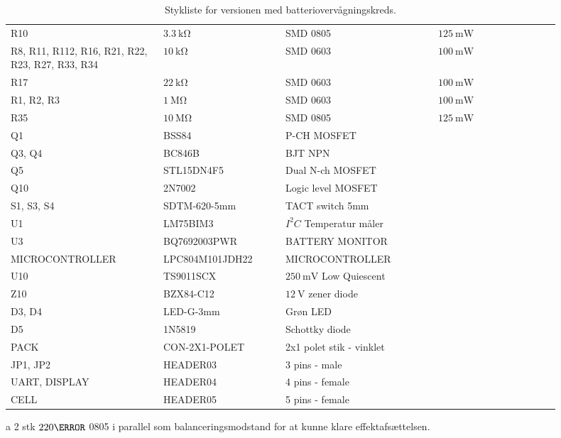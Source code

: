 \begin{table}[h!]
\begin{threeparttable}
\begin{tabular}{p{0.25\linewidth}p{0.2\linewidth}p{0.25\linewidth}p{0.15\linewidth}p{0.05\linewidth}}
			R10 & $\SI{3.3}{\kilo\ohm}$ & SMD 0805 & $\SI{125}{\milli\watt}$  \\
			R8, R11, R112, R16, R21, R22, R23, R27, R33, R34 & $\SI{10}{\kilo\ohm}$ & SMD 0603 & $\SI{100}{\milli\watt}$  \\
			R17 & $\SI{22}{\kilo\ohm}$ & SMD 0603 & $\SI{100}{\milli\watt}$  \\
			R1, R2, R3 & $\SI{1}{\mega\ohm}$ & SMD 0603 & $\SI{100}{\milli\watt}$  \\
			R35 & $\SI{10}{\mega\ohm}$ & SMD 0805 & $\SI{125}{\milli\watt}$  \\
			\midrule
			Q1     & BSS84 & P-CH MOSFET &   \\
			Q3, Q4 & BC846B & BJT NPN &   \\
			Q5     & STL15DN4F5 & Dual N-ch MOSFET &   \\
			Q10    & 2N7002 & Logic level MOSFET &   \\
			\midrule
			S1, S3, S4 & SDTM-620-5mm  & TACT switch 5mm &   \\
			U1 & LM75BIM3 & $I^{2}C$ Temperatur måler &   \\
			U3 & BQ7692003PWR & BATTERY MONITOR &   \\
			MICROCONTROLLER & LPC804M101JDH22 & MICROCONTROLLER & \\
			U10 & TS9011SCX & $\SI{250}{\milli\volt}$ Low Quiescent &   \\
			Z10 & BZX84-C12 & $\SI{12}{\volt}$ zener diode&   \\
			D3, D4 & LED-G-3mm  & Grøn LED &   \\
			D5 & 1N5819 & Schottky diode &   \\
			PACK & CON-2X1-POLET & 2x1 polet stik - vinklet &   \\
			JP1, JP2 & HEADER03 & 3 pins - male &   \\
			UART, DISPLAY & HEADER04 & 4 pins - female &   \\
			CELL & HEADER05 & 5 pins - female &   \\
			\hline
			\bottomrule
		\end{tabular}
		\begin{tablenotes}
			\item[a] 2 stk $220\ohm$ 0805 i parallel som balanceringsmodstand for at kunne klare effektafsættelsen.
		\end{tablenotes}
	\end{threeparttable}
	\caption{Stykliste for versionen med batteriovervågningskreds.}
\end{table} 



